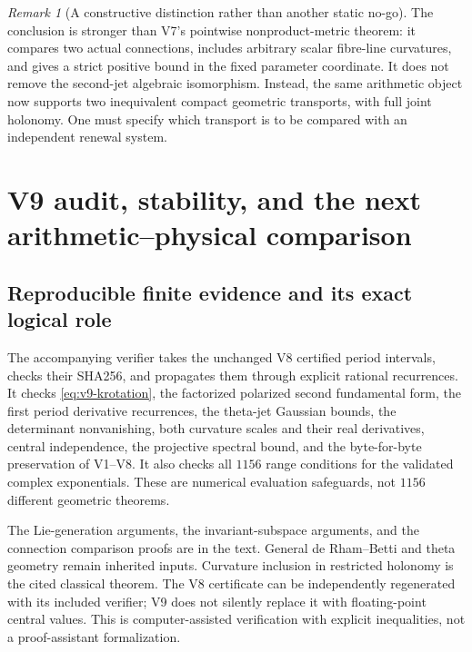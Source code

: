 \documentclass[11pt]{article}
\theoremstyle{definition}
\theoremstyle{remark}
\newtheorem{remark}[remark]{Remark}
\begin{document}
\begin{remark}[A constructive distinction rather than another static no-go]
The conclusion is stronger than V7's pointwise nonproduct-metric theorem:
it compares two actual connections, includes arbitrary scalar fibre-line
curvatures, and gives a strict positive bound in the fixed parameter
coordinate. It does not remove the second-jet algebraic isomorphism.
Instead, the same arithmetic object now supports two inequivalent compact
geometric transports, with full joint holonomy. One must specify which
transport is to be compared with an independent renewal system.
\end{remark}

\section{V9 audit, stability, and the next arithmetic--physical comparison}
\label{sec:v9-status}

\subsection{Reproducible finite evidence and its exact logical role}
The accompanying verifier takes the unchanged V8 certified period intervals,
checks their SHA256, and propagates them through explicit rational
recurrences. It checks \cref{eq:v9-krotation}, the factorized polarized
second fundamental form, the first period derivative recurrences, the
theta-jet Gaussian bounds, the determinant nonvanishing, both curvature
scales and their real derivatives, central independence, the projective
spectral bound, and the byte-for-byte preservation of V1--V8.
It also checks all $1156$ range conditions for the validated complex
exponentials. These are numerical evaluation safeguards, not $1156$
different geometric theorems.

The Lie-generation arguments, the invariant-subspace arguments, and the
connection comparison proofs are in the text. General de Rham--Betti and
theta geometry remain inherited inputs. Curvature inclusion in restricted
holonomy is the cited classical theorem. The V8 certificate can be
independently regenerated with its included verifier; V9 does not silently
replace it with floating-point central values. This is computer-assisted
verification with explicit inequalities, not a proof-assistant formalization.
\end{document}
